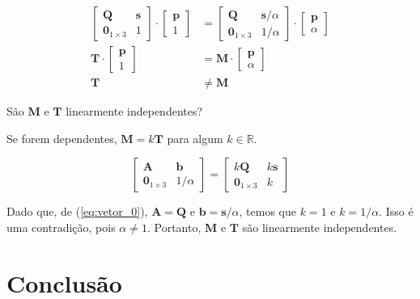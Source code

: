 \documentclass[a4paper]{article}
\begin{document}
\begin{align}
    \begin{bmatrix}
        \mathbf{Q} & \mathbf{s} \\
        \mathbf{0}_{1\times 3} & 1
    \end{bmatrix}\cdot\begin{bmatrix}\mathbf{p} \\ 1\end{bmatrix} &=
    \begin{bmatrix}
        \mathbf{Q} & \mathbf{s}/\alpha \\
        \mathbf{0}_{1\times 3} & 1/\alpha
    \end{bmatrix}\cdot\begin{bmatrix}\mathbf{p} \\ \alpha\end{bmatrix} \\
    \mathbf{T}\cdot\begin{bmatrix}\mathbf{p} \\ 1\end{bmatrix} &=
    \mathbf{M}\cdot\begin{bmatrix}\mathbf{p} \\ \alpha\end{bmatrix} \\
    \mathbf{T} &\neq \mathbf{M}
\end{align}

São $\mathbf{M}$ e $\mathbf{T}$ linearmente independentes?

Se forem dependentes, $\mathbf{M} = k\mathbf{T}$ para algum $k \in \mathbb{R}$.

\begin{equation}
    \begin{bmatrix}
        \mathbf{A} & \mathbf{b} \\
        \mathbf{0}_{1\times 3} & 1/\alpha
    \end{bmatrix} =
    \begin{bmatrix}
        k\mathbf{Q} & k\mathbf{s} \\
        \mathbf{0}_{1\times 3} & k
    \end{bmatrix}
\end{equation}

Dado que, de (\ref{eq:vetor_0}), $\mathbf{A} = \mathbf{Q}$ e $\mathbf{b} = \mathbf{s}/\alpha$, temos que $k = 1$ e $k = 1/\alpha$. Isso é uma contradição, pois $\alpha \neq 1$. Portanto, $\mathbf{M}$ e $\mathbf{T}$ são linearmente independentes.

\section{Conclusão}
\end{document}
